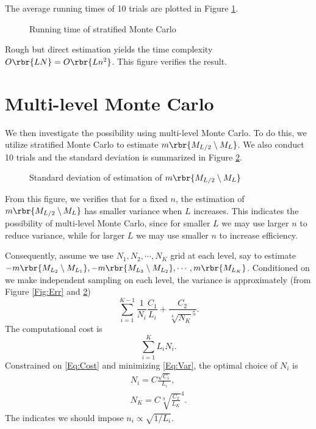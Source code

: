 \documentclass[english, nochinese]{pnote}
\begin{document}
The average running times of 10 trials are plotted in Figure \ref{Fig:Time}.

\begin{figure}[htbp]
\centering

\caption{Running time of stratified Monte Carlo}
\label{Fig:Time}
\end{figure}

Rough but direct estimation yields the time complexity $ O \rbr{ L N } = O \rbr{ L n^2 } $. This figure verifies the result.

\section{Multi-level Monte Carlo}

We then investigate the possibility using multi-level Monte Carlo. To do this, we utilize stratified Monte Carlo to estimate $ m \rbr{ M_{ L / 2 } \setminus M_L } $. We also conduct 10 trials and the standard deviation is summarized in Figure \ref{Fig:Multi}.

\begin{figure}[htbp]
\centering

\caption{Standard deviation of estimation of $ m \rbr{ M_{ L / 2 } \setminus M_L } $}
\label{Fig:Multi}
\end{figure}

From this figure, we verifies that for a fixed $n$, the estimation of $ m \rbr{ M_{ L / 2 } \setminus M_L } $ has smaller variance when $L$ increases. This indicates the possibility of multi-level Monte Carlo, since for smaller $L$ we may use larger $n$ to reduce variance, while for larger $L$ we may use smaller $n$ to increase efficiency.

Consequently, assume we use $ N_1, N_2, \cdots, N_K $ grid at each level, say to estimate $ -m \rbr{ M_{L_2} \setminus M_{L_1} }, -m \rbr{ M_{L_3} \setminus M_{L_2} }, \cdots, m \rbr{M_{L_K}} $. Conditioned on we make independent sampling on each level, the variance is approximately (from Figure \ref{Fig:Err} and \ref{Fig:Multi})
\begin{equation} \label{Eq:Var}
\sum_{ i = 1 }^{ K - 1 } \frac{1}{N_i} \frac{C_1}{L_i} + \frac{C_2}{\sqrt[4]{N_K}^5}.
\end{equation}
The computational cost is
\begin{equation} \label{Eq:Cost}
\sum_{ i = 1 }^K L_i N_i.
\end{equation}
Constrained on \eqref{Eq:Cost} and minimizing \eqref{Eq:Var}, the optimal choice of $N_i$ is
\begin{gather}
N_i = C \frac{\sqrt{C_1}}{L_i}, \\
N_K = C \sqrt[9]{\frac{C_2}{L_K}}^4.
\end{gather}
The indicates we should impose $ n_i \propto \sqrt{ 1 / L_i } $.
\end{document}
